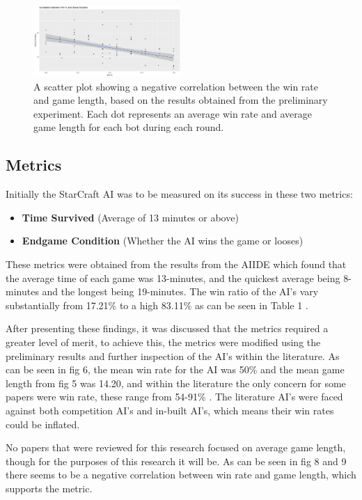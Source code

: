 \documentclass[journal]{IEEEtran}
\begin{document}
\begin{figure}[H]
	\centering
	\includegraphics[width=0.5\textwidth]{ScatterWinvsDurLine}
	\caption{A scatter plot showing a negative correlation between the win rate and game length, based on the results obtained from the preliminary experiment. Each dot represents an average win rate and average game length for each bot during each round.}
	\label{Fig8}
\end{figure}
\subsection{Metrics}

Initially the StarCraft AI was to be measured on its success in these two metrics:
\begin{itemize}
	\item \textbf{Time Survived} (Average of 13 minutes or above)
	\item \textbf{Endgame Condition} (Whether the AI wins the game or looses)
\end{itemize}
These metrics were obtained from the results from the AIIDE which found that the average time of each game was 13-minutes, and the quickest average being 8-minutes and the longest being 19-minutes. The win ratio of the AI's vary substantially from 17.21\% to a high 83.11\% as can be seen in Table 1 \cite{Results}. 

After presenting these findings, it was discussed that the metrics required a greater level of merit, to achieve this, the metrics were modified using the preliminary results and further inspection of the AI's within the literature. As can be seen in fig 6, the mean win rate for the AI was 50\% and the mean game length from fig 5 was 14.20, and within the literature the only concern for some papers were win rate, these range from 54-91\% \cite{ELGoal,Swen,OnlineEvo,GoalDriven}. The literature AI's were faced against both competition AI's and in-built AI's, which means their win rates could be inflated.

No papers that were reviewed for this research focused on average game length, though for the purposes of this research it will be. As can be seen in fig 8 and 9 there seems to be a negative correlation between win rate and game length, which supports the metric.
\newline
\end{document}
